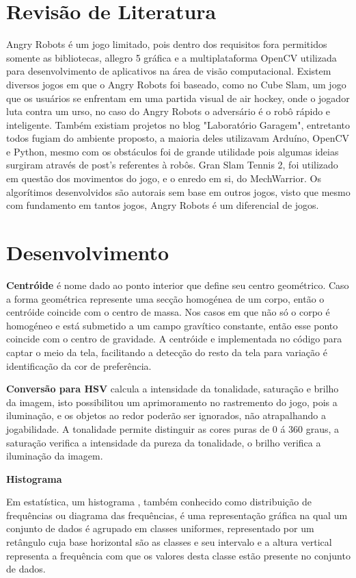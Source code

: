 \documentclass[12pt,openright,twoside,a4paper,brazil]{abntex2}
\begin{document}
\section*{Revisão de Literatura}

Angry Robots é um jogo limitado, pois dentro dos requisitos fora permitidos somente as bibliotecas, allegro 5 gráfica e a multiplataforma OpenCV utilizada para desenvolvimento de aplicativos na área de visão computacional.
Existem diversos jogos em que o Angry Robots foi baseado, como no Cube Slam, um jogo que os usuários se enfrentam em uma partida visual de air hockey, onde o jogador luta contra um urso, no caso do Angry Robots o adversário é o robô rápido e inteligente. Também existiam projetos no blog "Laboratório Garagem", entretanto todos fugiam do ambiente proposto, a maioria deles utilizavam Arduíno, OpenCV e Python, mesmo com os obstáculos foi de grande utilidade pois algumas ideias surgiram através de post's referentes à robôs. Gran Slam Tennis 2, foi utilizado em questão dos movimentos do jogo, e o enredo em si, do MechWarrior. Os algorítimos desenvolvidos são autorais sem base em outros jogos, visto que mesmo com fundamento em tantos jogos, Angry Robots é um diferencial de jogos.

\section*{Desenvolvimento}

\textbf{Centróide} 
é nome dado ao ponto interior que define seu centro geométrico. Caso a forma geométrica represente uma secção homogénea de um corpo, então o centróide coincide com o centro de massa. Nos casos em que não só o corpo é homogéneo e está submetido a um campo gravítico constante, então esse ponto coincide com o centro de gravidade. A centróide e implementada no código para captar o meio da tela, facilitando a detecção do resto da tela para variação é identificação da cor de preferência.

\textbf{Conversão para HSV}
calcula a intensidade da tonalidade, saturação e brilho da imagem, isto possibilitou um aprimoramento no rastremento do jogo, pois a iluminação, e os objetos ao redor poderão ser ignorados, não atrapalhando a jogabilidade. A tonalidade permite distinguir as cores puras de 0 á 360 graus, a saturação verifica a intensidade da pureza da tonalidade, o brilho verifica a iluminação da imagem.

 
\textbf{Histograma}

Em estatística, um histograma , também conhecido como distribuição de frequências ou diagrama das frequências, é uma representação gráfica na qual um conjunto de dados é agrupado em classes uniformes, representado por um retângulo cuja base horizontal são as classes e seu intervalo e a altura vertical representa a frequência com que os valores desta classe estão presente no conjunto de dados.
\end{document}
